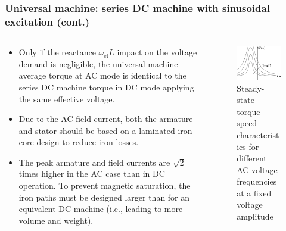 \begin{frame}
	\frametitle{Universal machine: series DC machine with sinusoidal excitation (cont.)}
	\begin{columns}
		\begin{column}{0.55\textwidth}
		\begin{itemize}
			\item Only if the reactance $\omega_\mathrm{el}L$ impact on the voltage demand is negligible, the universal machine average torque at AC mode is identical to the series DC machine torque in DC mode applying the same effective voltage.
			\item<2-> Due to the AC field current, both the armature and stator should be based on a laminated iron core design to reduce iron losses.
			\item<3-> The peak armature and field currents are $\sqrt{2}$ times higher in the AC case than in DC operation. To prevent magnetic saturation, the iron paths must be designed larger than for an equivalent DC machine (i.e., leading to more volume and weight).
		\end{itemize}
\end{column}
\hfill
\begin{column}{0.45\textwidth}
	\begin{figure}
		\centering
		\includegraphics[scale=1.1]{fig/lec03/Universal_machine_torque_speed.pdf}
		\caption{Steady-state torque-speed characteristics for different AC voltage frequencies at a fixed voltage amplitude}
		\label{fig:Universal_machine_torque_speed}
\end{figure}
\end{column}
\end{columns}
\end{frame}


